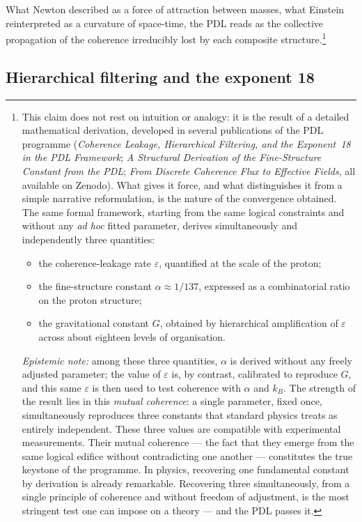 \documentclass[11pt, a4paper, openright]{book}
\begin{document}
What Newton described as a force of attraction between masses, what Einstein reinterpreted as a curvature of space-time, the PDL reads as the collective propagation of the coherence irreducibly lost by each composite structure.\footnote{%
  This claim does not rest on intuition or analogy: it is the result of a detailed mathematical derivation, developed in several publications of the PDL programme (\textit{Coherence Leakage, Hierarchical Filtering, and the Exponent~18 in the PDL Framework}; \textit{A Structural Derivation of the Fine-Structure Constant from the PDL}; \textit{From Discrete Coherence Flux to Effective Fields}, all available on Zenodo). What gives it force, and what distinguishes it from a simple narrative reformulation, is the nature of the convergence obtained. The same formal framework, starting from the same logical constraints and without any \emph{ad hoc} fitted parameter, derives simultaneously and independently three quantities:
  \begin{itemize}
  \item the coherence-leakage rate $\varepsilon$, quantified at the scale of the proton;
  \item the fine-structure constant $\alpha \approx 1/137$, expressed as a combinatorial ratio on the proton structure;
  \item the gravitational constant $G$, obtained by hierarchical amplification of $\varepsilon$ across about eighteen levels of organisation.
  \end{itemize}
\textit{Epistemic note:} among these three quantities, $\alpha$ is derived without any freely adjusted parameter; the value of $\varepsilon$ is, by contrast, calibrated to reproduce $G$, and this same $\varepsilon$ is then used to test coherence with $\alpha$ and $k_B$. The strength of the result lies in this \emph{mutual coherence}: a single parameter, fixed once, simultaneously reproduces three constants that standard physics treats as entirely independent.
  These three values are compatible with experimental measurements. Their mutual coherence — the fact that they emerge from the same logical edifice without contradicting one another — constitutes the true keystone of the programme. In physics, recovering one fundamental constant by derivation is already remarkable. Recovering three simultaneously, from a single principle of coherence and without freedom of adjustment, is the most stringent test one can impose on a theory — and the PDL passes it.}

\subsection*{Hierarchical filtering and the exponent 18}
\end{document}
